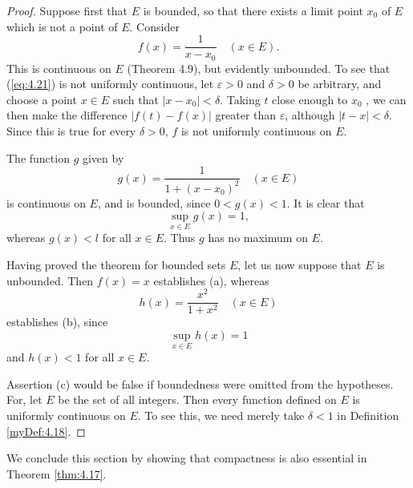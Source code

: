 \begin{proof}
    Suppose first that $E$ is bounded, 
    so that there exists a limit point $x_0$ of $E$ 
    which is not a point of $E$. 
    Consider
    \begin{equation}
        \label{eq:4.21}
        f(x) = \frac{1}{x - x_0}
        \quad
        (x \in E).
    \end{equation}
    This is continuous on $E$ (Theorem 4.9), but evidently unbounded. 
    To see that (\ref{eq:4.21}) is not uniformly continuous, 
    let $\varepsilon > 0$ and $\delta > 0$ be arbitrary, 
    and choose a point $x \in E$ such that $\left| x - x_0 \right| < \delta$.
    Taking $t$ close enough to $x_0$ , 
    we can then make the difference $\left| f(t) - f(x) \right|$ greater than $\varepsilon$, although $\left| t-x \right| < \delta$.
    Since this is true for every $\delta > 0$, 
    $f$ is not uniformly continuous on $E$.

    The function $g$ given by
    \begin{equation}
        \label{eq:4.22}
        g(x) = \frac{1}{1+(x-x_0)^2}
        \quad
        (x \in E)
    \end{equation}
    is continuous on $E$, and is bounded, since $0 < g(x) < 1$. 
    It is clear that 
    \begin{equation*}
        \sup_{x \in E} g(x) = 1,
    \end{equation*}
    whereas $g(x) < l$ for all $x \in E$. Thus $g$ has no maximum on $E$.

    Having proved the theorem for bounded sets $E$, 
    let us now suppose that $E$ is unbounded. 
    Then $f(x) = x$ establishes (a), whereas
    \begin{equation}
        \label{eq:4.23}
        h(x) = \frac{x^2}{1 + x^2}
        \quad 
        (x \in E)
    \end{equation}
    establishes (b), since
    \begin{equation*}
        \sup_{x \in E} h(x) = 1
    \end{equation*}
    and $h(x) < 1$ for all $x \in E$.

    Assertion (c) would be false if boundedness were omitted from the
    hypotheses. 
    For, let $E$ be the set of all integers. 
    Then every function defined on $E$ is uniformly continuous on $E$. 
    To see this, we need merely take $\delta < 1$ in Definition \ref{myDef:4.18}.
\end{proof}

We conclude this section by showing that compactness is also essential in
Theorem \ref{thm:4.17}.


